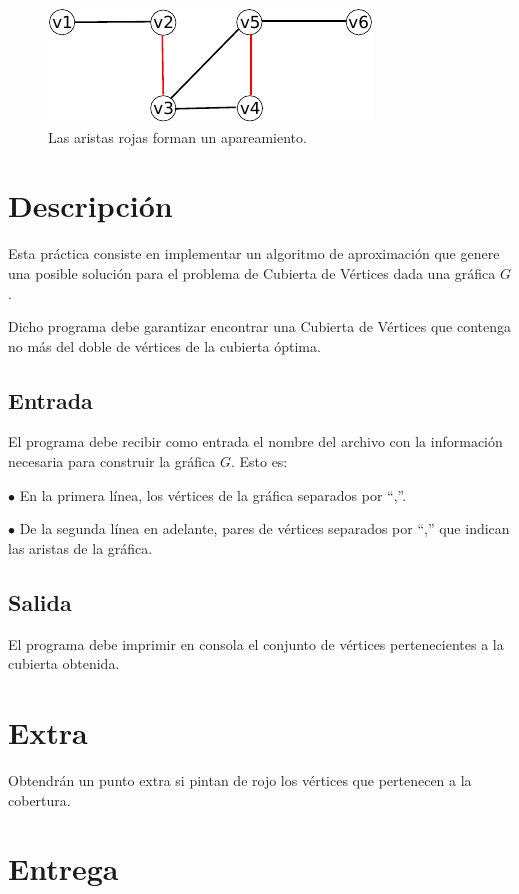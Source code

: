 \documentclass{article}
\begin{document}
\begin{figure}[htbp]
\centering
\includegraphics[scale=1.5]{g1}
\caption{Las aristas rojas forman un apareamiento.}
\label{grafica1}
\end{figure}

\section{Descripción}

Esta práctica consiste en implementar un algoritmo de aproximación que genere una posible solución para el problema de Cubierta de Vértices dada una gráfica $G$.

Dicho programa debe garantizar encontrar una Cubierta de Vértices que contenga no más del doble de vértices de la cubierta óptima.

\subsection{Entrada}

El programa debe recibir como entrada el nombre del archivo con la información necesaria para construir la gráfica $G$. Esto es:

$\bullet$ En la primera línea, los vértices de la gráfica separados por ``,''.

$\bullet$ De la segunda línea en adelante, pares de vértices separados por ``,'' que indican las aristas de la gráfica.

\subsection{Salida}

El programa debe imprimir en consola el conjunto de vértices pertenecientes a la cubierta obtenida.

\section{Extra}

Obtendrán un punto extra si pintan de rojo los vértices que pertenecen a la cobertura.

\section{Entrega}
\end{document}
